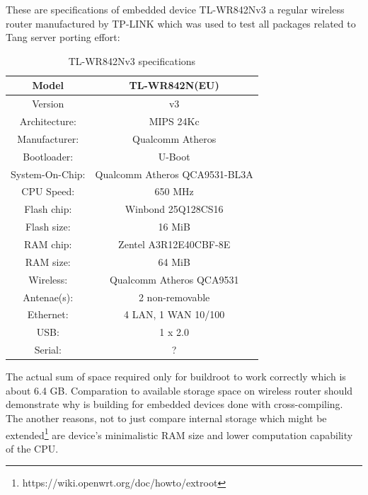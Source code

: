 These are specifications of embedded device TL-WR842Nv3 a regular wireless router manufactured by TP-LINK which was used to test all packages related to Tang server porting effort:

\begin{table}[h]
\centering
\label{routerspec}
\begin{tabular}{c|c}
\hline
Model           &   TL-WR842N(EU)                   \\ \hline
Version         &   v3                              \\ \hline
Architecture:   &   MIPS 24Kc                       \\ \hline
Manufacturer:   &   Qualcomm Atheros                \\ \hline
Bootloader:     &   U-Boot                          \\ \hline
System-On-Chip: &   Qualcomm Atheros QCA9531-BL3A   \\ \hline
CPU Speed:      &   650 MHz                         \\ \hline
Flash chip:     &   Winbond 25Q128CS16              \\ \hline
Flash size:     &   16 MiB                          \\ \hline
RAM chip:       &   Zentel A3R12E40CBF-8E           \\ \hline
RAM size:       &   64 MiB                          \\ \hline
Wireless:       &   Qualcomm Atheros QCA9531        \\ \hline
Antenae(s):     &   2 non-removable                 \\ \hline
Ethernet:       &   4 LAN, 1 WAN 10/100             \\ \hline
USB:            &   1 x 2.0                         \\ \hline
Serial:         &   ?                               \\ \hline
\end{tabular}
\caption{TL-WR842Nv3 specifications}
\end{table}

The actual sum of space required only for buildroot to work correctly which is about 6.4 GB.
Comparation to available storage space on wireless router should demonstrate why is building for embedded devices done with cross-compiling.
The another reasons, not to just compare internal storage which might be extended\footnote{https://wiki.openwrt.org/doc/howto/extroot} are device's minimalistic RAM size and lower computation capability of the CPU.

